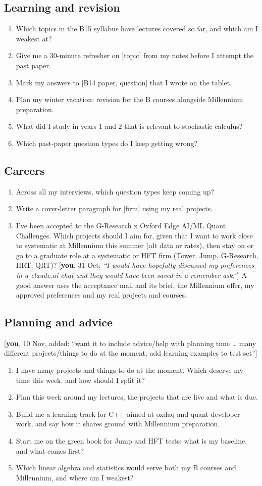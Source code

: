 \documentclass[10pt]{extarticle}
\newcommand{\you}[2]{{\small[\textbf{you}, #1: \textit{``#2''}]}}
\newcommand{\youx}[1]{{\small[\textbf{you}, #1]}}
\newcommand{\Sub}[1]{\subsection*{#1}}
\begin{document}
\Sub{Learning and revision}
{\small\begin{enumerate}[label=\arabic*.,start=27]
\item Which topics in the B15 syllabus have lectures covered so far, and which am I weakest at?
\item Give me a 30-minute refresher on [topic] from my notes before I attempt the past paper.
\item Mark my answers to [B14 paper, question] that I wrote on the tablet.
\item Plan my winter vacation: revision for the B courses alongside Millennium preparation.
\item What did I study in years 1 and 2 that is relevant to stochastic calculus?
\item Which past-paper question types do I keep getting wrong?
\end{enumerate}}

\Sub{Careers}
{\small\begin{enumerate}[label=\arabic*.,start=33]
\item Across all my interviews, which question types keep coming up?
\item Write a cover-letter paragraph for [firm] using my real projects.
\item I've been accepted to the G-Research x Oxford Edge AI/ML Quant Challenges. Which projects should I aim for, given that I want to work close to systematic at Millennium this summer (alt data or rates), then stay on or go to a graduate role at a systematic or HFT firm (Tower, Jump, G-Research, HRT, QRT)? \you{31 Oct}{I would have hopefully discussed my preferences in a claude.ai chat and they would have been saved in a remember ask.} A good answer uses the acceptance mail and its brief, the Millennium offer, my approved preferences and my real projects and courses.
\end{enumerate}}

\Sub{Planning and advice} {\small\youx{10 Nov, added: ``want it to include advice/help with planning time \ldots{} many different projects/things to do at the moment; add learning examples to test set''}}
{\small\begin{enumerate}[label=P\arabic*.]
\item I have many projects and things to do at the moment. Which deserve my time this week, and how should I split it?
\item Plan this week around my lectures, the projects that are live and what is due.
\item Build me a learning track for C++ aimed at oxdaq and quant developer work, and say how it shares ground with Millennium preparation.
\item Start me on the green book for Jump and HFT tests: what is my baseline, and what comes first?
\item Which linear algebra and statistics would serve both my B courses and Millennium, and where am I weakest?
\end{enumerate}}
\end{document}
